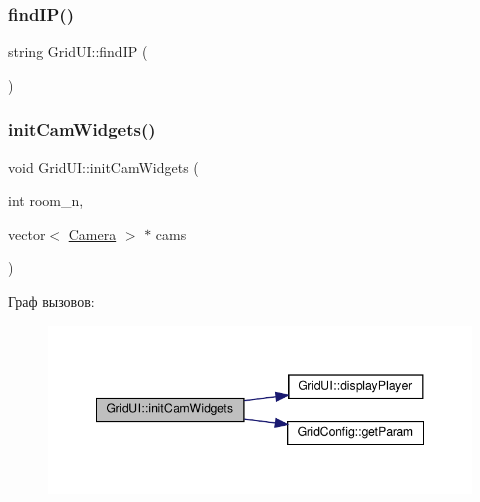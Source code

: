 \mbox{\label{class_grid_u_i_a73a5b4a63e6e6dd0b58b962295b8fa0f}} 
\subsubsection{\texorpdfstring{find\+I\+P()}{findIP()}}
{\footnotesize\ttfamily string Grid\+U\+I\+::find\+IP (\begin{DoxyParamCaption}{ }\end{DoxyParamCaption})\hspace{0.3cm}{\ttfamily [private]}}

\mbox{\label{class_grid_u_i_a2bbb2ec1b28ee7bce2c59e2315576803}} 
\subsubsection{\texorpdfstring{init\+Cam\+Widgets()}{initCamWidgets()}}
{\footnotesize\ttfamily void Grid\+U\+I\+::init\+Cam\+Widgets (\begin{DoxyParamCaption}\item[{int}]{room\+\_\+n,  }\item[{vector$<$ \hyperlink{struct_camera}{Camera} $>$ $\ast$}]{cams }\end{DoxyParamCaption})\hspace{0.3cm}{\ttfamily [private]}}

Граф вызовов\+:\nopagebreak
\begin{figure}[H]
\begin{center}
\leavevmode
\includegraphics[width=348pt]{class_grid_u_i_a2bbb2ec1b28ee7bce2c59e2315576803_cgraph}
\end{center}
\end{figure}
\mbox{\label{class_grid_u_i_ae8dc93dea42ac08339f9e5b774ca9af4}} 
